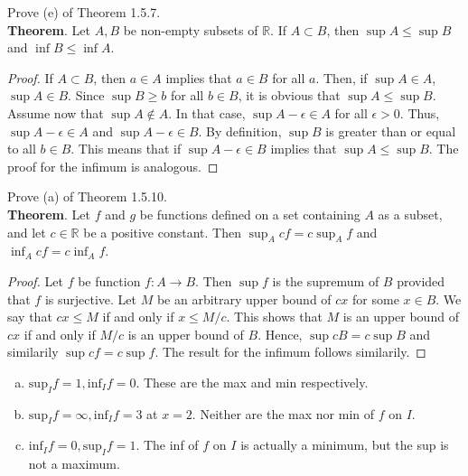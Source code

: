\documentclass[12pt]{book}
\newenvironment{exercise}[2][Exercise]{\begin{trivlist}
\item[\hskip \labelsep {\bfseries #1}\hskip \labelsep {\bfseries #2.}]}{\end{trivlist}}
\begin{document}
\begin{exercise}{1.5.7}
Prove (e) of Theorem 1.5.7. \\

\textbf{Theorem}. Let $A,B$ be non-empty subsets of $\mathbb{R}$. If $A \subset B$, then $\sup A \leq \sup B$ and $\inf B \leq \inf A$.
	\begin{proof}
	If $A \subset B$, then $a \in A$ implies that $a \in B$ for all $a$. Then, if $\sup A \in A$, $\sup A \in B$. Since $\sup B \geq b$ for all $b \in B$, it is obvious that $\sup A \leq \sup B$. Assume now that $\sup A \notin A$. In that case, $\sup A - \epsilon \in A$ for all $\epsilon > 0$. Thus, $\sup A - \epsilon \in A$ and $\sup A - \epsilon \in B$. By definition, $\sup B$ is greater than or equal to all $b \in B$. This means  that if $\sup A - \epsilon \in B$ implies that $\sup A \leq \sup B$. The proof for the infimum is analogous.
	\end{proof}
\end{exercise}

\begin{exercise}{1.5.10}
Prove (a) of Theorem 1.5.10. \\

\textbf{Theorem}. Let $f$ and $g$ be functions defined on a set containing $A$ as a subset, and let $c \in \mathbb{R}$ be a positive constant. Then $\sup_A c f= c \sup_A f$ and $\inf_A c f = c \inf_A f$.
	\begin{proof}
	Let $f$ be function $f: A \to B$. Then $\sup f$ is the supremum of $B$ provided that $f$ is surjective. Let $M$ be an arbitrary upper bound of $cx$ for some $x \in B$. We say that $c x \leq M$ if and only if $x \leq M/c$. This shows that $M$ is an upper bound of $c x$ if and only if $M/c$ is an upper bound of $B$. Hence, $\sup c B = c \sup B$ and similarily $\sup c f = c \sup f$. The result for the infimum follows similarily.
	\end{proof}
\end{exercise}

\begin{exercise}{1.5.8}
\begin{enumerate}[(a)]
\item $\mathrm{sup}_I f = 1, \mathrm{inf}_I f = 0$. These are the max and min respectively.
\item $\mathrm{sup}_I f = \infty, \mathrm{inf}_I f = 3$ at $x = 2$. Neither are the max nor min of $f$ on $I$.
\item $\mathrm{inf}_I f = 0, \mathrm{sup}_I f = 1$. The inf of $f$ on $I$ is actually a minimum, but the sup is not a maximum.
\end{enumerate}


\end{exercise}
\end{document}
